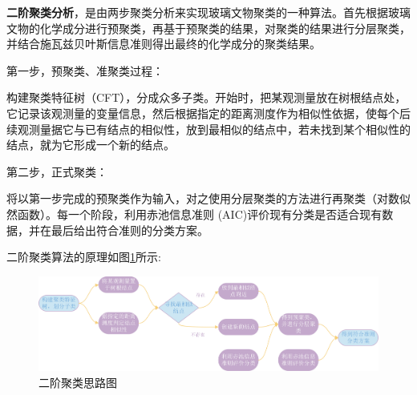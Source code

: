 \documentclass{my_paper}
\begin{document}
\textbf{二阶聚类分析}，是由两步聚类分析来实现玻璃文物聚类的一种算法。首先根据玻璃文物的化学成分进行预聚类，再基于预聚类的结果，对聚类的结果进行分层聚类，并结合施瓦兹贝叶斯信息准则得出最终的化学成分的聚类结果。\cite{孙李红2019基于二阶聚类分析的客户管理分类研究}

第一步，预聚类、准聚类过程：

构建聚类特征树（CFT），分成众多子类。开始时，把某观测量放在树根结点处，它记录该观测量的变量信息，然后根据指定的距离测度作为相似性依据，使每个后续观测量据它与已有结点的相似性，放到最相似的结点中，若未找到某个相似性的结点，就为它形成一个新的结点。

第二步，正式聚类：

将以第一步完成的预聚类作为输入，对之使用分层聚类的方法进行再聚类（对数似然函数）。每一个阶段，利用赤池信息准则 (AIC)评价现有分类是否适合现有数据，并在最后给出符合准则的分类方案。

二阶聚类算法的原理如图\ref{二阶聚类思路图}所示:
\begin{figure}[H]
    \centering
    \includegraphics[width=1\textwidth]{二阶聚类思路图.jpg}
    \caption{二阶聚类思路图}
    \label{二阶聚类思路图}
\end{figure}
\end{document}
